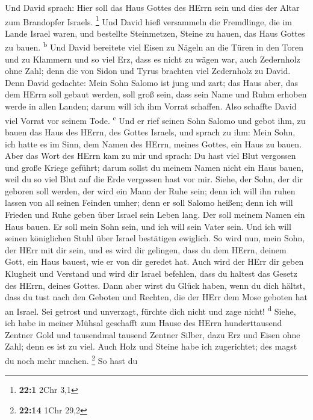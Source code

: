  Und David sprach: Hier soll das Haus Gottes des HErrn
sein und dies der Altar zum Brandopfer Israels. \footnote{\textbf{22:1}
  2Chr 3,1}  Und David hieß versammeln die Fremdlinge, die
im Lande Israel waren, und bestellte Steinmetzen, Steine zu hauen, das
Haus Gottes zu bauen. \textsuperscript{b}  Und David
bereitete viel Eisen zu Nägeln an die Türen in den Toren und zu Klammern
und so viel Erz, dass es nicht zu wägen war,  auch
Zedernholz ohne Zahl; denn die von Sidon und Tyrus brachten viel
Zedernholz zu David.  Denn David gedachte: Mein Sohn
Salomo ist jung und zart; das Haus aber, das dem HErrn soll gebaut
werden, soll groß sein, dass sein Name und Ruhm erhoben werde in allen
Landen; darum will ich ihm Vorrat schaffen. Also schaffte David viel
Vorrat vor seinem Tode. \textsuperscript{c}  Und er rief
seinen Sohn Salomo und gebot ihm, zu bauen das Haus des HErrn, des
Gottes Israels,  und sprach zu ihm: Mein Sohn, ich hatte
es im Sinn, dem Namen des HErrn, meines Gottes, ein Haus zu bauen.
 Aber das Wort des HErrn kam zu mir und sprach: Du hast
viel Blut vergossen und große Kriege geführt; darum sollst du meinem
Namen nicht ein Haus bauen, weil du so viel Blut auf die Erde vergossen
hast vor mir.  Siehe, der Sohn, der dir geboren soll
werden, der wird ein Mann der Ruhe sein; denn ich will ihn ruhen lassen
von all seinen Feinden umher; denn er soll Salomo heißen; denn ich will
Frieden und Ruhe geben über Israel sein Leben lang.  Der
soll meinem Namen ein Haus bauen. Er soll mein Sohn sein, und ich will
sein Vater sein. Und ich will seinen königlichen Stuhl über Israel
bestätigen ewiglich.  So wird nun, mein Sohn, der HErr
mit dir sein, und es wird dir gelingen, dass du dem HErrn, deinem Gott,
ein Haus bauest, wie er von dir geredet hat.  Auch wird
der HErr dir geben Klugheit und Verstand und wird dir Israel befehlen,
dass du haltest das Gesetz des HErrn, deines Gottes. 
Dann aber wirst du Glück haben, wenn du dich hältst, dass du tust nach
den Geboten und Rechten, die der HErr dem Mose geboten hat an Israel.
Sei getrost und unverzagt, fürchte dich nicht und zage nicht!
\textsuperscript{d}  Siehe, ich habe in meiner Mühsal
geschafft zum Hause des HErrn hunderttausend Zentner Gold und tausendmal
tausend Zentner Silber, dazu Erz und Eisen ohne Zahl; denn es ist zu
viel. Auch Holz und Steine habe ich zugerichtet; des magst du noch mehr
machen. \footnote{\textbf{22:14} 1Chr 29,2}  So hast du
